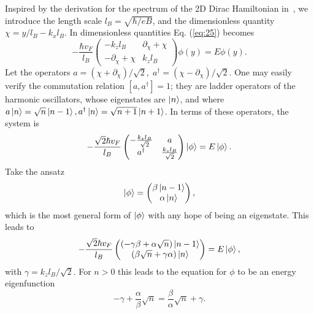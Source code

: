 Inspired by the derivation for the spectrum of the 2D Dirac Hamiltonian in~\cite{wehlingDiracMaterials2014}, we introduce the length scale $l_B = \sqrt{\hbar / eB}$, and the dimensionless quantity $\chi = y /l_{B} - k_x l_{B}$.
In dimensionless quantities Eq. (\ref{eq:25}) becomes
\begin{equation}
  -\frac{{\hbar v_F}}{l_{B}}
  \begin{pmatrix}
    -k_z l_B & \partial _{\chi } + \chi \\
    -\partial _{\chi } + \chi & k_z l_B
  \end{pmatrix}
  \phi(y)  =  E \phi(y).
\end{equation}
Let the operators \(a = \left( \chi + \partial _{\chi } \right) / \sqrt{2},\; a^{\dagger} = \left( \chi - \partial _{\chi } \right) /\sqrt{2}\).
One may easily verify the commutation relation $[a, a^{\dagger}] = 1$;
they are ladder operators of the harmonic oscillators, whose eigenstates are $\ket{n}$, and where $a\ket{n} = \sqrt{n}\ket{n-1}, a^{\dagger} \ket{n} = \sqrt{n+1} \ket{n+1}$.
In terms of these operators, the system is
\begin{equation}
  -\frac{\sqrt{2} \hbar v_F}{l_B}
  \begin{pmatrix}
    -\frac{k_zl_B}{\sqrt{2}} & a\\
    a^{\dagger} & \frac{k_zl_B}{\sqrt{2}}
  \end{pmatrix}
  \ket{\phi } = E \ket{\phi }.
\end{equation}
Take the ansatz
\begin{equation}
  \ket{\phi } =
  \begin{pmatrix}
    \beta \ket{n-1}\\
    \alpha  \ket{n}
  \end{pmatrix},
\end{equation}
which is the most general form of $\ket{\phi }$ with any hope of being an eigenstate.
This leads to
\begin{equation}
  -\frac{\sqrt{2} \hbar v_F}{l_B}
  \begin{pmatrix}
    \left( -\gamma \beta + \alpha \sqrt{n} \right) \ket{n-1}\\
    \left( \beta \sqrt{n} + \gamma \alpha \right) \ket{n}
  \end{pmatrix}
  = E \ket{\phi },
\end{equation}
with $\gamma  = k_zl_B / \sqrt{2}$.
For $n > 0$ this leads to the equation for $\phi $ to be an energy eigenfunction
\begin{equation}
  -\gamma + \frac{\alpha}{\beta } \sqrt{n} = \frac{\beta }{\alpha } \sqrt{n} + \gamma.
\end{equation}

